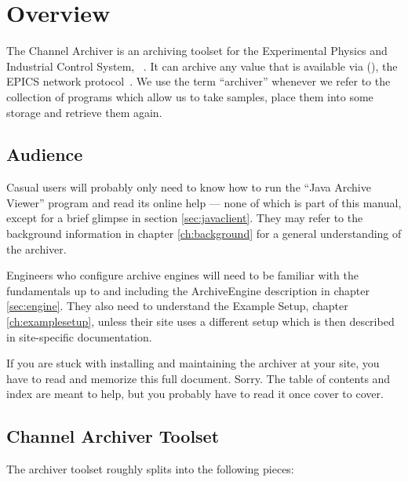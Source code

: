 \chapter{Overview}
The Channel Archiver is an archiving toolset for the Experimental Physics
and Industrial Control System, ~\cite{ANLweb}.
It can archive any value that is available via 
(), the EPICS network protocol~\cite{hill89}.
We use the term ``archiver'' whenever we refer to the collection of
programs which allow us to take samples, place them into some storage
and retrieve them again.

\section{Audience}
Casual users will probably only need to know how to run the ``Java Archive
Viewer'' program and read its online help ---
none of which is part of this manual, except for a brief glimpse in 
section \ref{sec:javaclient}.
They may refer to the background information in chapter
\ref{ch:background} for a general understanding of the archiver.

Engineers who configure archive engines will need to be familiar with
the fundamentals up to and including the ArchiveEngine description in
chapter \ref{sec:engine}. They also need to understand the Example
Setup, chapter \ref{ch:examplesetup}, unless their site uses a
different setup which is then described in site-specific
documentation.

If you are stuck with installing and maintaining the archiver at your
site, you have to read and memorize this full document. Sorry. The table of
contents and index are meant to help, but you probably have to read it
once cover to cover.

\section{Channel Archiver Toolset}
The archiver toolset roughly splits into the following pieces:

